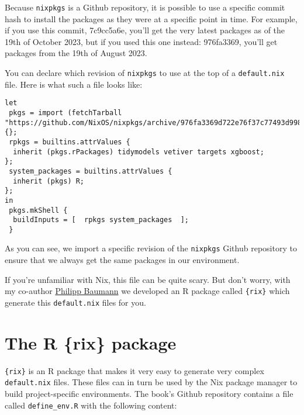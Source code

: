 \documentclass[
  letterpaper,
  paper=6in:9in,
  pagesize=pdftex,
  headinclude=on,
  footinclude=on,
  12pt]{scrbook}
\begin{document}
Because \texttt{nixpkgs} is a Github repository, it is possible to use a
specific commit hash to install the packages as they were at a specific
point in time. For example, if you use this commit, 7c9cc5a6e, you'll
get the very latest packages as of the 19th of October 2023, but if you
used this one instead: 976fa3369, you'll get packages from the 19th of
August 2023.

You can declare which revision of \texttt{nixpkgs} to use at the top of
a \texttt{default.nix} file. Here is what such a file looks like:

\begin{verbatim}
let
 pkgs = import (fetchTarball "https://github.com/NixOS/nixpkgs/archive/976fa3369d722e76f37c77493d99829540d43845.tar.gz") {};
 rpkgs = builtins.attrValues {
  inherit (pkgs.rPackages) tidymodels vetiver targets xgboost;
};
 system_packages = builtins.attrValues {
  inherit (pkgs) R;
};
in
 pkgs.mkShell {
  buildInputs = [  rpkgs system_packages  ];
 }
\end{verbatim}

As you can see, we import a specific revision of the \texttt{nixpkgs}
Github repository to ensure that we always get the same packages in our
environment.

If you're unfamiliar with Nix, this file can be quite scary. But don't
worry, with my co-author
\href{https://github.com/philipp-baumann}{Philipp Baumann} we developed
an R package called \texttt{\{rix\}} which generate this
\texttt{default.nix} files for you.

\section{The R \{rix\} package}\label{the-r-rix-package}

\texttt{\{rix\}} is an R package that makes it very easy to generate
very complex \texttt{default.nix} files. These files can in turn be used
by the Nix package manager to build project-specific environments. The
book's Github repository contains a file called \texttt{define\_env.R}
with the following content:
\end{document}

